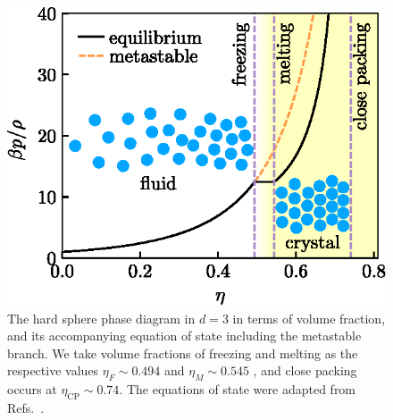 \documentclass[11pt,twoside]{report}
\begin{document}
\begin{figure}
  \includegraphics[width=0.85\linewidth,outer]{hs-phase-diagram}
  \caption[The hard sphere phase diagram]{
    The hard sphere phase diagram in $d=3$ in terms of volume fraction, and its accompanying equation of state including the metastable branch.
    We take volume fractions of freezing and melting as the respective values $\eta_F \sim 0.494$ and $\eta_M \sim 0.545$ \cite{HooverJCP1968}, and close packing occurs at $\eta_\mathrm{CP} \sim 0.74$.
    The equations of state were adapted from Refs.\ \cite{CarnahanJCP1969,SpeedyJPCM1998,BannermanJCP2010}.
  }
  \label{fig:hs-phase-diagram}
\end{figure}
\end{document}
